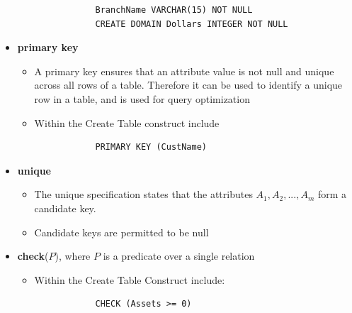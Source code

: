 \begin{itemize}[label=\(\rhd\)]
\begin{itemize}[label=\(\rhd\)]
\begin{lstlisting}
            BranchName VARCHAR(15) NOT NULL
            CREATE DOMAIN Dollars INTEGER NOT NULL
        \end{lstlisting}
    \end{itemize}
    \item \textbf{primary key}
    \begin{itemize}[label=\(\rhd\)]
        \item A primary key ensures that an attribute value is not null and unique across all rows of a table. Therefore it can be used to identify a unique row in a table, and is used for query optimization
        \item Within the Create Table construct include \begin{lstlisting}
            PRIMARY KEY (CustName)
        \end{lstlisting}
    \end{itemize}
    \item \textbf{unique}
    \begin{itemize}[label=\(\rhd\)]
        \item The unique specification states that the attributes $A_1,A_2,...,A_m$ form a candidate key.
        \item Candidate keys are permitted to be null 
    \end{itemize}
    \item \textbf{check}($P$), where $P$ is a predicate over a single relation 
    \begin{itemize}[label=\(\rhd\)]
        \item Within the Create Table Construct include: \begin{lstlisting}
            CHECK (Assets >= 0)
        \end{lstlisting}
    \end{itemize}
\end{itemize}

